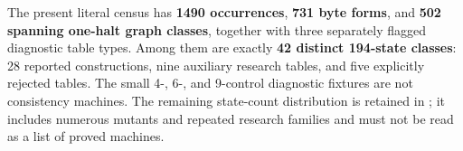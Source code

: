 The present literal census has \textbf{1490 occurrences}, \textbf{731
byte forms}, and \textbf{502 spanning one-halt graph classes}, together with
three separately flagged diagnostic table types. Among them are exactly
\textbf{42 distinct 194-state classes}: 28 reported constructions, nine
auxiliary research tables, and five explicitly rejected tables. The small
4-, 6-, and 9-control diagnostic fixtures are not consistency machines.
The remaining state-count distribution is retained in
; it includes numerous mutants and repeated
research families and must not be read as a list of proved machines.
